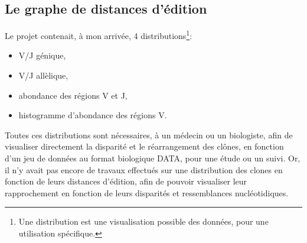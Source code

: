 \documentclass[pdftex,12pt,a4paper]{report}
\begin{document}
\begin{spacing}{1.2}
\chapter{Le graphe de distances d'édition}

Le projet contenait, à mon arrivée, 4 distributions\footnote{Une distribution est une visualisation possible des données, pour une utilisation spécifique.}:
\begin{itemize}
\item V/J génique,
\item V/J allèlique,
\item abondance des régions V et J,
\item histogramme d'abondance des régions V.
\end{itemize}
Toutes ces distributions sont nécessaires, à un médecin ou un biologiste, afin de visualiser directement la disparité et le réarrangement des clônes, en fonction d'un jeu de données au format biologique DATA, pour une étude ou un suivi. Or, il n'y avait pas encore de travaux effectués sur une distribution des clones en fonction de leurs distances d'édition, afin de pouvoir visualiser leur rapprochement en fonction de leurs disparités et ressemblances nucléotidiques.


\end{spacing}
\end{document}
